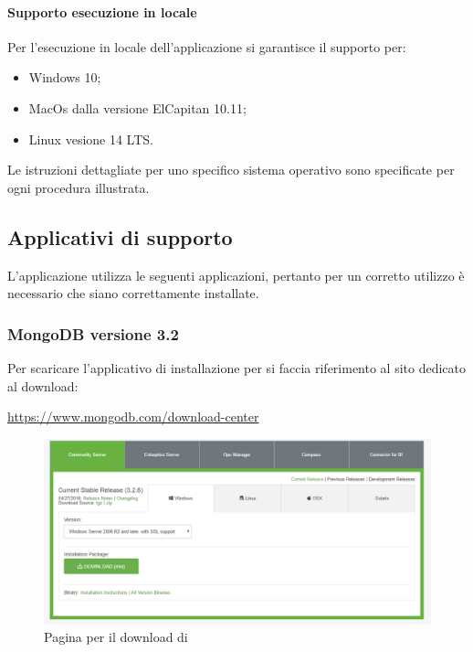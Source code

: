 \documentclass[12pt,a4paper]{article}
\begin{document}
	\paragraph{Supporto esecuzione in locale}
	Per l'esecuzione in locale  dell'applicazione si garantisce il supporto per:
		\begin{itemize}
			\item Windows 10;
			\item MacOs dalla versione ElCapitan 10.11;
			\item Linux vesione 14 LTS.
		\end{itemize}
	
	
	Le istruzioni dettagliate per uno specifico sistema operativo sono specificate per ogni procedura illustrata.
	
	\subsection{Applicativi di supporto}
	L'applicazione \prj{} utilizza le seguenti applicazioni, pertanto per un corretto utilizzo è necessario che siano correttamente installate.
	\subsubsection{MongoDB versione 3.2}
	Per scaricare l'applicativo di installazione per  si faccia riferimento al sito dedicato al download:
	\begin{center} \url{https://www.mongodb.com/download-center}
	\end{center}
	
	\begin{figure}[H]	
		\centering
		\includegraphics[width=1.0\linewidth]{../img/manualeInstallazione/mongoDownloadCenter.png}
		\caption{Pagina per il download di }
		\label{Pagina per il download di MongoDB}
	\end{figure}
	
\end{document}
